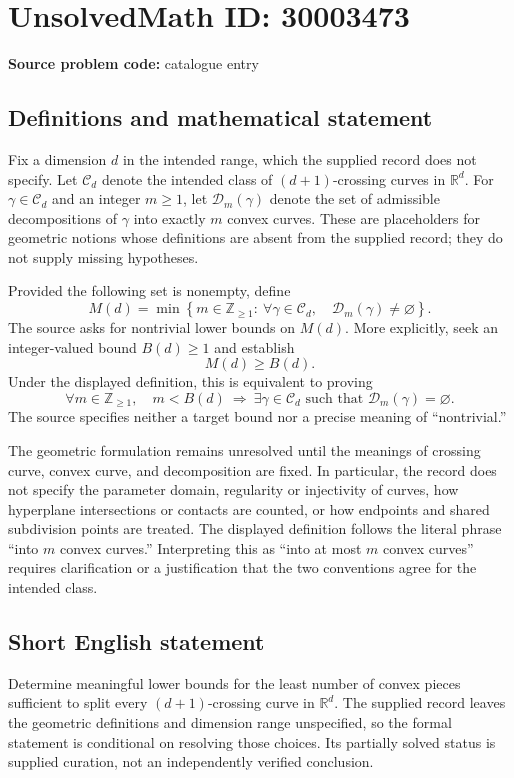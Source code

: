 \documentclass[11pt]{article}
\newcommand{\Z}{\mathbb{Z}}
\newcommand{\R}{\mathbb{R}}
\begin{document}
\section*{UnsolvedMath ID: 30003473}
\textbf{Source problem code:} catalogue entry
\subsection{Definitions and mathematical statement}
Fix a dimension \(d\) in the intended range, which the supplied record does not specify. Let \(\mathcal C_d\) denote the intended class of \((d+1)\)-crossing curves in \(\R^d\). For \(\gamma\in\mathcal C_d\) and an integer \(m\geq1\), let \(\mathcal D_m(\gamma)\) denote the set of admissible decompositions of \(\gamma\) into exactly \(m\) convex curves. These are placeholders for geometric notions whose definitions are absent from the supplied record; they do not supply missing hypotheses.

Provided the following set is nonempty, define
\[
M(d)=\min\left\{m\in\Z_{\geq1}:\ \forall\gamma\in\mathcal C_d,\quad \mathcal D_m(\gamma)\ne\varnothing\right\}.
\]
The source asks for nontrivial lower bounds on \(M(d)\). More explicitly, seek an integer-valued bound \(B(d)\geq1\) and establish
\[
M(d)\geq B(d).
\]
Under the displayed definition, this is equivalent to proving
\[
\forall m\in\Z_{\geq1},\quad m<B(d)\ \Longrightarrow\ \exists\gamma\in\mathcal C_d\text{ such that }\mathcal D_m(\gamma)=\varnothing.
\]
The source specifies neither a target bound nor a precise meaning of ``nontrivial.''

The geometric formulation remains unresolved until the meanings of crossing curve, convex curve, and decomposition are fixed. In particular, the record does not specify the parameter domain, regularity or injectivity of curves, how hyperplane intersections or contacts are counted, or how endpoints and shared subdivision points are treated. The displayed definition follows the literal phrase ``into \(m\) convex curves.'' Interpreting this as ``into at most \(m\) convex curves'' requires clarification or a justification that the two conventions agree for the intended class.
\subsection{Short English statement}
Determine meaningful lower bounds for the least number of convex pieces sufficient to split every \((d+1)\)-crossing curve in \(\R^d\). The supplied record leaves the geometric definitions and dimension range unspecified, so the formal statement is conditional on resolving those choices. Its partially solved status is supplied curation, not an independently verified conclusion.
\end{document}
